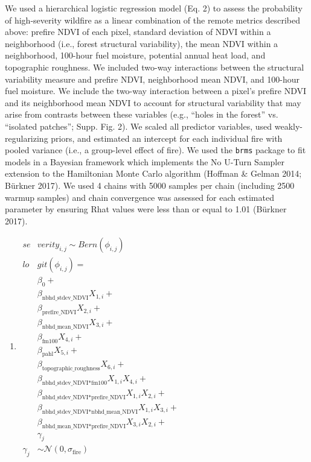\documentclass[]{article}
\providecommand{\tightlist}{%
  \setlength{\itemsep}{0pt}\setlength{\parskip}{0pt}}
\begin{document}
We used a hierarchical logistic regression model (Eq. 2) to assess the
probability of high-severity wildfire as a linear combination of the
remote metrics described above: prefire NDVI of each pixel, standard
deviation of NDVI within a neighborhood (i.e., forest structural
variability), the mean NDVI within a neighborhood, 100-hour fuel
moisture, potential annual heat load, and topographic roughness. We
included two-way interactions between the structural variability measure
and prefire NDVI, neighborhood mean NDVI, and 100-hour fuel moisture. We
include the two-way interaction between a pixel's prefire NDVI and its
neighborhood mean NDVI to account for structural variability that may
arise from contrasts between these variables (e.g., ``holes in the
forest'' vs. ``isolated patches''; Supp. Fig. 2). We scaled all
predictor variables, used weakly-regularizing priors, and estimated an
intercept for each individual fire with pooled variance (i.e., a
group-level effect of fire). We used the \texttt{brms} package to fit
models in a Bayesian framework which implements the No U-Turn Sampler
extension to the Hamiltonian Monte Carlo algorithm (Hoffman \& Gelman
2014; Bürkner 2017). We used 4 chains with 5000 samples per chain
(including 2500 warmup samples) and chain convergence was assessed for
each estimated parameter by ensuring Rhat values were less than or equal
to 1.01 (Bürkner 2017).

\begin{enumerate}
\def\labelenumi{(\arabic{enumi})}
\setcounter{enumi}{1}
\tightlist
\item
  \(\begin{aligned} \label{eq-severity-model} se&verity_{i, j} \sim Bern(\phi_{i,j}) \\ lo&git(\phi_{i,j}) = \\ & \beta_0 + \\ & \beta_{\text{nbhd\_stdev\_NDVI}}X_{1,i} + \\ & \beta_{\text{prefire\_NDVI}}X_{2,i} + \\ & \beta_{\text{nbhd\_mean\_NDVI}}X_{3,i} + \\ & \beta_{\text{fm100}}X_{4,i} + \\ & \beta_{\text{pahl}}X_{5,i} + \\ & \beta_{\text{topographic\_roughness}}X_{6,i} + \\ & \beta_{\text{nbhd\_stdev\_NDVI*fm100}}X_{1,i}X_{4,i} + \\ & \beta_{\text{nbhd\_stdev\_NDVI*prefire\_NDVI}}X_{1,i}X_{2,i} + \\ & \beta_{\text{nbhd\_stdev\_NDVI*nbhd\_mean\_NDVI}}X_{1,i}X_{3,i} + \\ & \beta_{\text{nbhd\_mean\_NDVI*prefire\_NDVI}}X_{3,i}X_{2,i} + \\ & \gamma_j \\ \gamma_j &\sim \mathcal{N}(0, \sigma_{\text{fire}}) \end{aligned}\)
\end{enumerate}
\end{document}
